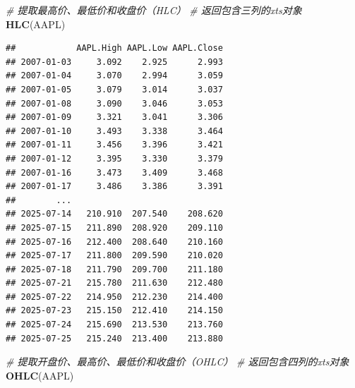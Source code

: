 \documentclass[]{ctexbook}
\newenvironment{Shaded}{\begin{snugshade}}{\end{snugshade}}
\newcommand{\CommentTok}[1]{\textcolor[rgb]{0.56,0.35,0.01}{\textit{#1}}}
\newcommand{\FunctionTok}[1]{\textcolor[rgb]{0.13,0.29,0.53}{\textbf{#1}}}
\newcommand{\NormalTok}[1]{#1}
\begin{document}
\begin{Shaded}
\begin{Highlighting}[]
\CommentTok{\# 提取最高价、最低价和收盘价（HLC）}
\CommentTok{\# 返回包含三列的xts对象}
\FunctionTok{HLC}\NormalTok{(AAPL)}
\end{Highlighting}
\end{Shaded}

\begin{verbatim}
##            AAPL.High AAPL.Low AAPL.Close
## 2007-01-03     3.092    2.925      2.993
## 2007-01-04     3.070    2.994      3.059
## 2007-01-05     3.079    3.014      3.037
## 2007-01-08     3.090    3.046      3.053
## 2007-01-09     3.321    3.041      3.306
## 2007-01-10     3.493    3.338      3.464
## 2007-01-11     3.456    3.396      3.421
## 2007-01-12     3.395    3.330      3.379
## 2007-01-16     3.473    3.409      3.468
## 2007-01-17     3.486    3.386      3.391
##        ...                              
## 2025-07-14   210.910  207.540    208.620
## 2025-07-15   211.890  208.920    209.110
## 2025-07-16   212.400  208.640    210.160
## 2025-07-17   211.800  209.590    210.020
## 2025-07-18   211.790  209.700    211.180
## 2025-07-21   215.780  211.630    212.480
## 2025-07-22   214.950  212.230    214.400
## 2025-07-23   215.150  212.410    214.150
## 2025-07-24   215.690  213.530    213.760
## 2025-07-25   215.240  213.400    213.880
\end{verbatim}

\begin{Shaded}
\begin{Highlighting}[]
\CommentTok{\# 提取开盘价、最高价、最低价和收盘价（OHLC）}
\CommentTok{\# 返回包含四列的xts对象}
\FunctionTok{OHLC}\NormalTok{(AAPL)}
\end{Highlighting}
\end{Shaded}
\end{document}
